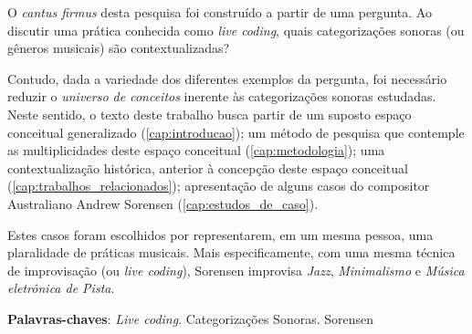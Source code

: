 \setlength{\absparsep}{18pt} %
\begin{resumo}
O \emph{cantus firmus} desta pesquisa foi construído a partir de uma pergunta. Ao discutir uma prática conhecida como \textit{live coding}, quais categorizações sonoras (ou gêneros musicais) são contextualizadas? 

Contudo, dada a variedade dos diferentes exemplos da pergunta,  foi necessário reduzir o \emph{universo de conceitos} inerente às categorizações sonoras estudadas. Neste sentido, o texto deste trabalho busca partir de um suposto espaço conceitual generalizado (\autoref{cap:introducao}); um método de pesquisa que contemple as multiplicidades deste espaço conceitual (\autoref{cap:metodologia}); uma contextualização histórica, anterior à concepção deste espaço conceitual (\autoref{cap:trabalhos_relacionados}); apresentação de alguns casos do compositor Australiano Andrew Sorensen (\autoref{cap:estudos_de_caso}).

Estes casos foram escolhidos por representarem, em um mesma pessoa, uma plaralidade de práticas musicais. Mais especificamente, com uma mesma técnica de improvisação (ou \emph{live coding}), Sorensen improvisa \emph{Jazz}, \emph{Minimalismo} e \emph{Música eletrônica de Pista}.

\textbf{Palavras-chaves}: \textit{Live coding}. Categorizações Sonoras. Sorensen
\end{resumo}

\begin{comment}
\begin{resumo}[Abstract]
 \begin{otherlanguage*}{english}
   This is the english abstract.

   \vspace{\onelineskip}
 
   \noindent 
   \textbf{Key-words}: latex. abntex. text editoration.
 \end{otherlanguage*}
\end{resumo}

\begin{resumo}[Résumé]
 \begi'n{otherlanguage*}{french}
    Il s'agit d'un résumé en français.
 
   \textbf{Mots-clés}: latex. abntex. publication de textes.
 \end{otherlanguage*}
\end{resumo}

\begin{resumo}[Resumen]
 \begin{otherlanguage*}{spanish}
   Este es el resumen en español.
  
   \textbf{Palabras clave}: latex. abntex. publicación de textos.
 \end{otherlanguage*}
\end{resumo}
\end{comment}